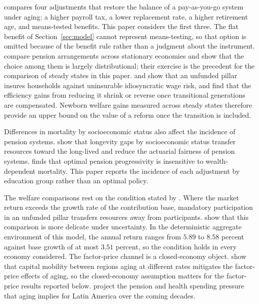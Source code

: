 \documentclass[12pt,a4paper]{article}
\begin{document}
\citet{Kitao2014} compares four adjustments that restore the balance of a pay-as-you-go system under aging: a higher payroll tax, a lower replacement rate, a higher retirement age, and means-tested benefits. This paper considers the first three. The flat benefit of Section~\ref{sec:model} cannot represent means-testing, so that option is omitted because of the benefit rule rather than a judgment about the instrument. \citet{HuggettVentura1999} compare pension arrangements across stationary economies and show that the choice among them is largely distributional; their exercise is the precedent for the comparison of steady states in this paper. \citet{ConesaKrueger1999} and \citet{NishiyamaSmetters2007} show that an unfunded pillar insures households against uninsurable idiosyncratic wage risk, and \citet{NishiyamaSmetters2007} find that the efficiency gains from reducing it shrink or reverse once transitional generations are compensated. Newborn welfare gains measured across steady states therefore provide an upper bound on the value of a reform once the transition is included.

Differences in mortality by socioeconomic status also affect the incidence of pension systems. \citet{SanchezRomeroEtAl2020} show that longevity gaps by socioeconomic status transfer resources toward the long-lived and reduce the actuarial fairness of pension systems. \citet{Bagchi2019} finds that optimal pension progressivity is insensitive to wealth-dependent mortality. This paper reports the incidence of each adjustment by education group rather than an optimal policy.

The welfare comparisons rest on the condition stated by \citet{Aaron1966}. Where the market return exceeds the growth rate of the contribution base, mandatory participation in an unfunded pillar transfers resources away from participants. \citet{AbelEtAl1989} show that this comparison is more delicate under uncertainty. In the deterministic aggregate environment of this model, the annual return ranges from $5.89$ to $8.58$ percent against base growth of at most $3.51$ percent, so the condition holds in every economy considered. The factor-price channel is a closed-economy object. \citet{AttanasioKitaoViolante2007} show that capital mobility between regions aging at different rates mitigates the factor-price effects of aging, so the closed-economy assumption matters for the factor-price results reported below. \citet{PessinoTerMinassian2021} project the pension and health spending pressure that aging implies for Latin America over the coming decades.
\end{document}
